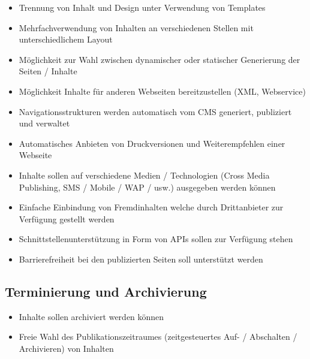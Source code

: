 \begin{itemize}
\item
Trennung von Inhalt und Design unter Verwendung von Templates
\item
Mehrfachverwendung von Inhalten an verschiedenen Stellen mit unterschiedlichem Layout
\item
Möglichkeit zur Wahl zwischen dynamischer oder statischer Generierung der Seiten / Inhalte
\item
Möglichkeit Inhalte für anderen Webseiten bereitzustellen (XML, Webservice)
\item
Navigationsstrukturen werden automatisch vom CMS generiert, publiziert und verwaltet
\item
Automatisches Anbieten von Druckversionen und Weiterempfehlen einer Webseite
\item
Inhalte sollen auf verschiedene Medien / Technologien (Cross Media Publishing, SMS / Mobile / WAP / usw.) ausgegeben werden können
\item
Einfache Einbindung von Fremdinhalten welche durch Drittanbieter zur Verfügung gestellt werden
\item
Schnittstellenunterstützung in Form von APIs sollen zur Verfügung stehen
\item
Barrierefreiheit bei den publizierten Seiten soll unterstützt werden
\end{itemize}


\subsection{Terminierung und Archivierung}

\begin{itemize}
\item
Inhalte sollen archiviert werden können
\item
Freie Wahl des Publikationszeitraumes (zeitgesteuertes Auf- / Abschalten / Archivieren) von Inhalten
\end{itemize}


